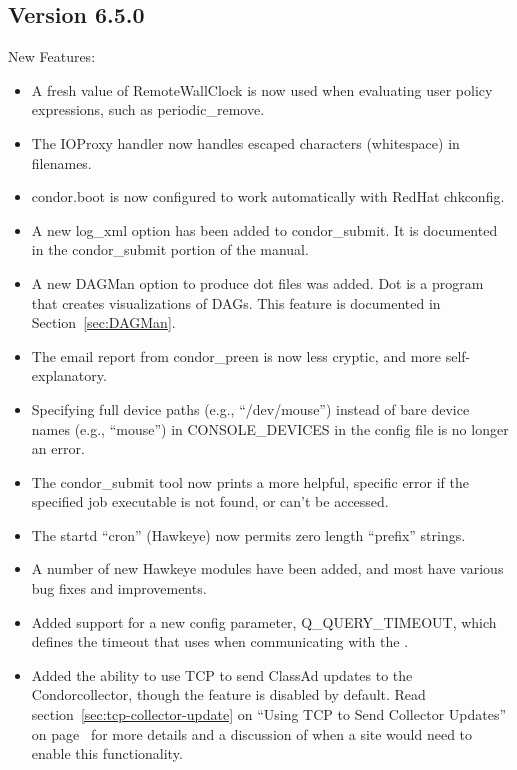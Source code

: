 \subsection{\label{sec:New-6-5-0}Version 6.5.0}
\noindent New Features:
\begin{itemize}

\item A fresh value of RemoteWallClock is now used when evaluating
user policy expressions, such as periodic\_remove.

\item The IOProxy handler now handles escaped characters (whitespace)
in filenames.

\item condor.boot is now configured to work automatically with RedHat
chkconfig.

\item A new log\_xml option has been added to condor\_submit. It is
documented in the condor\_submit portion of the manual.

\item A new DAGMan option to produce dot files was added. Dot is a
program that creates visualizations of DAGs. This feature is
documented in Section~\ref{sec:DAGMan}.

\item The email report from condor\_preen is now less cryptic, and
more self-explanatory.

\item Specifying full device paths (e.g., ``/dev/mouse'') instead of bare
device names (e.g., ``mouse'') in CONSOLE\_DEVICES in the config file is no
longer an error.

\item The condor\_submit tool now prints a more helpful, specific error if
the specified job executable is not found, or can't be accessed.

\item The startd ``cron'' (Hawkeye) now permits zero length ``prefix''
strings.

\item A number of new Hawkeye modules have been added, and most have
various bug fixes and improvements.

\item Added support for a new config parameter, Q\_QUERY\_TIMEOUT, which
defines the timeout that  uses when communicating with the
.

\item Added the ability to use TCP to send ClassAd updates to the
Condor{collector}, though the feature is disabled by default.
Read section~\ref{sec:tcp-collector-update} on ``Using TCP to Send
Collector Updates'' on page~\pageref{sec:tcp-collector-update} for
more details and a discussion of when a site would need to enable this 
functionality.

\end{itemize}

